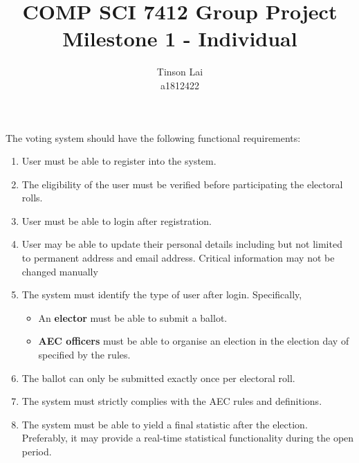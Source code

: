 \documentclass[12pt]{article}
\title{COMP SCI 7412 Group Project Milestone 1 - Individual}
\author{Tinson Lai \\ a1812422}
\date{}
\begin{document}
\maketitle

The voting system should have the following functional requirements:
\begin{enumerate}
  \item User must be able to register into the system.
  \item The eligibility of the user must be verified before participating the electoral rolls.
  \item User must be able to login after registration.
  \item User may be able to update their personal details including but not limited to permanent address and email address. Critical information may not be changed manually
  \item The system must identify the type of user after login. Specifically,
  \begin{itemize}
    \item An \textbf{elector} must be able to submit a ballot.
    \item \textbf{AEC officers} must be able to organise an election in the election day of specified by the rules.
  \end{itemize}
  \item The ballot can only be submitted exactly once per electoral roll.
  \item The system must strictly complies with the AEC rules and definitions.
  \item The system must be able to yield a final statistic after the election. Preferably, it may provide a real-time statistical functionality during the open period.
\end{enumerate}
\end{document}

